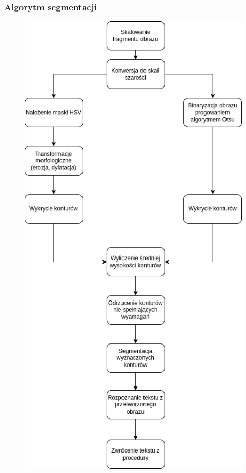 \documentclass{beamer}
\begin{document}
    \begin{frame}
        \frametitle{Algorytm segmentacji}
        \begin{figure}
            \includegraphics[scale=0.2]{../WIZUT-Dyplom-styl/Pictures/characters_alg}
        \end{figure}
    \end{frame}
\end{document}
